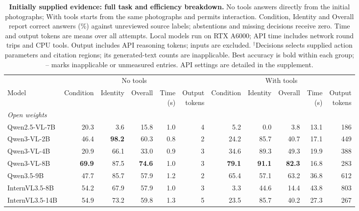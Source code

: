 \begin{table}[t]
\centering\small
\setlength{\tabcolsep}{3.5pt}
\begin{minipage}{.96\textwidth}\centering
\caption{\textbf{Initially supplied evidence: full task and efficiency breakdown.}
No tools answers directly from the initial photographs; With tools starts from the same photographs and permits interaction.
Condition, Identity and Overall report correct answers (\%) against unreviewed source labels; abstentions and missing decisions receive zero.
Time and output tokens are means over all attempts. Local models run on RTX A6000; API time includes network round trips and CPU tools.
Output includes API reasoning tokens; inputs are excluded. $^{\dagger}$Decisions selects supplied action parameters and citation regions; its generated-text counts are inapplicable.
Best accuracy is bold within each group; -- marks inapplicable or unmeasured entries. API settings are detailed in the supplement.}
\label{tab:sufficient-detail}
\begin{tabular}{@{}lrrrrrrrrrr@{}}
\toprule
 & \multicolumn{5}{c}{No tools} & \multicolumn{5}{c}{With tools}\\
\cmidrule(lr){2-6}\cmidrule(l){7-11}
Model & Condition & Identity & Overall & \shortstack{Time\\(s)} & \shortstack{Output\\tokens} & Condition & Identity & Overall & \shortstack{Time\\(s)} & \shortstack{Output\\tokens}\\
\midrule
\multicolumn{11}{l}{\emph{Open weights}}\\
Qwen2.5-VL-7B & 20.3 & 3.6 & 15.8 & 1.0 & 4 & 5.2 & 0.0 & 3.8 & 13.1 & 186\\
Qwen3-VL-2B & 46.4 & \textbf{98.2} & 60.3 & 0.8 & 2 & 24.2 & 85.7 & 40.7 & 17.1 & 449\\
Qwen3-VL-4B & 20.9 & 66.1 & 33.0 & 0.9 & 3 & 34.6 & 89.3 & 49.3 & 19.9 & 388\\
Qwen3-VL-8B & \textbf{69.9} & 87.5 & \textbf{74.6} & 1.0 & 3 & \textbf{79.1} & \textbf{91.1} & \textbf{82.3} & 16.8 & 283\\
Qwen3.5-9B & 47.7 & 85.7 & 57.9 & 1.2 & 2 & 65.4 & 57.1 & 63.2 & 36.8 & 612\\
InternVL3.5-8B & 54.2 & 67.9 & 57.9 & 1.0 & 3 & 3.3 & 44.6 & 14.4 & 43.8 & 803\\
InternVL3.5-14B & 54.9 & 73.2 & 59.8 & 1.3 & 5 & 23.5 & 85.7 & 40.2 & 27.3 & 267\\

\end{tabular}
\end{minipage}
\end{table}
